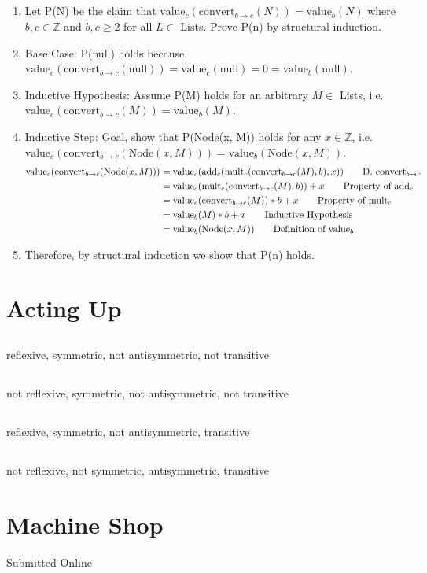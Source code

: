 \documentclass[11pt]{article}
\newcommand{\Z}{\mathbb{Z}}
\def\imp{\rightarrow}
\begin{document}
\subsection{} %
\begin{enumerate}
	\item Let P(N) be the claim that $\text{value}_{c}(\text{convert}_{b \imp c}(N)) = \text{value}_{b}(N)$ where $b, c \in \Z$ and $b,c \geq 2$ for all $L \in$ Lists. Prove P(n) by structural induction. 
	\item Base Case: P(null) holds because, $\text{value}_{c}(\text{convert}_{b \imp c}(\text{null})) = \text{value}_{c}(\text{null}) = 0 = \text{value}_{b}(\text{null})$.
	\item Inductive Hypothesis: Assume P(M) holds for an arbitrary $M \in$ Lists, i.e. \\ $\text{value}_c(\text{convert}_{b\imp c}(M)) = \text{value}_b(M)$.
	\item Inductive Step: Goal, show that P(Node(x, M)) holds for any $x \in \Z$, i.e. \\ $\text{value}_{c}(\text{convert}_{b \imp c}(\text{Node}(x, M))) = \text{value}_{b}(\text{Node}(x, M))$. 
	\begin{align*}
		\text{value}_{c}(\text{convert}_{b \imp c}(\text{Node}(x, M))) &= \text{value}_{c}(\text{add}_{c}(\text{mult}_{c}(\text{convert}_{b \imp c}(M), b), x)) \tag*{D. convert$_{b \imp c}$} \\
		&= \text{value}_{c}(\text{mult}_{c}(\text{convert}_{b \imp c}(M), b)) + x \tag*{Property of add$_{c}$} \\
		&= \text{value}_{c}(\text{convert}_{b \imp c}(M)) * b + x \tag*{Property of mult$_{c}$} \\
		&= \text{value}_{b}(M) * b + x \tag*{Inductive Hypothesis} \\
		&= \text{value}_{b}(\text{Node}(x, M)) \tag*{Definition of value$_b$}
	\end{align*}
\item Therefore, by structural induction we show that P(n) holds. 
\end{enumerate}

\section{Acting Up} %
\subsection{} %
reflexive, symmetric, not antisymmetric, not transitive

\subsection{} %
not reflexive, symmetric, not antisymmetric, not transitive

\subsection{} %
reflexive, symmetric, not antisymmetric, transitive

\subsection{} %
not reflexive, not symmetric, antisymmetric, transitive

\section{Machine Shop} %
Submitted Online
\end{document}
